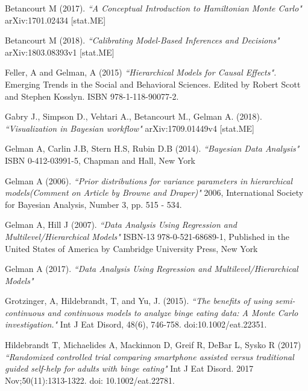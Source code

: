 \documentclass{article}
\begin{document}
\begin{thebibliography}{9}

Betancourt M (2017).
\textit{``A Conceptual Introduction to Hamiltonian Monte Carlo"} 
arXiv:1701.02434 [stat.ME]

Betancourt M (2018).
\textit{``Calibrating Model-Based Inferences and Decisions"} 
arXiv:1803.08393v1 [stat.ME]

Feller, A and Gelman, A (2015) \textit{``Hierarchical Models for Causal Effects".}
Emerging Trends in the Social and Behavioral Sciences. Edited by Robert Scott and Stephen Kosslyn. ISBN 978-1-118-90077-2.

Gabry J., Simpson D., Vehtari A., Betancourt M., Gelman A. (2018).
\textit{``Visualization in Bayesian workflow"} 
arXiv:1709.01449v4 [stat.ME]

Gelman A, Carlin J.B, Stern H.S, Rubin D.B (2014).
\textit{``Bayesian Data Analysis"}
ISBN 0-412-03991-5, Chapman and Hall, New York

Gelman A (2006).
\textit{``Prior distributions for variance parameters in hierarchical models(Comment on Article by Browne and Draper)"}
2006, International Society for Bayesian Analysis, Number 3, pp. 515 - 534.

Gelman A, Hill J (2007).
\textit{``Data Analysis Using Regression and Multilevel/Hierarchical Models"}
ISBN-13 978-0-521-68689-1, Published in the United States of America by Cambridge University Press, New York

Gelman A (2017).
\textit{``Data Analysis Using Regression and Multilevel/Hierarchical Models"}

Grotzinger, A, Hildebrandt, T, and Yu, J. (2015). 
\textit{``The benefits of using semi-continuous and continuous models to analyze binge eating data: A Monte Carlo investigation."}
 Int J Eat Disord, 48(6), 746-758. doi:10.1002/eat.22351.
 
Hildebrandt T, Michaelides A, Mackinnon D, Greif R, DeBar L, Sysko R (2017)
\textit{``Randomized controlled trial comparing smartphone assisted
versus traditional guided self-help for adults with binge eating"}
Int J Eat Disord. 2017 Nov;50(11):1313-1322. doi: 10.1002/eat.22781.


\end{thebibliography}
\end{document}
